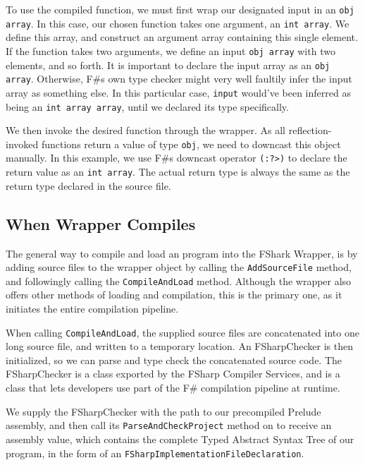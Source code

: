 To use the compiled \fshark{} function, we must first wrap our designated input in
an \texttt{obj array}. In this case, our chosen \fshark{} function takes one
argument, an \texttt{int array}. We define this array, and construct an argument
array containing this single element. If the \fshark{} function takes two
arguments, we define an input \texttt{obj array} with two elements, and so
forth.
It is important to declare the input array as an \texttt{obj array}. Otherwise,
F\#s own type checker might very well faultily infer the input array as
something else. In this particular case, \texttt{input} would've been inferred
as being an \texttt{int array array}, until we declared its type specifically.

We then invoke the desired function through the wrapper. As all
reflection-invoked functions return a value of type \texttt{obj}, we need to
downcast this object manually.
In this example, we use F\#s downcast operator \texttt{(:?>)} to declare the
return value as an \texttt{int array}. The actual return type is always the same as the
return type declared in the source \fshark{} file.

\subsection{When \fshark{} Wrapper Compiles}
\label{sec:fsharkwrappercompiles}
The general way to compile and load an \fshark{} program into the FShark Wrapper,
is by adding \fshark{} source files to the wrapper object by calling the
\texttt{AddSourceFile} method, and followingly calling the \texttt{CompileAndLoad}
method. Although the \fshark{} wrapper also offers other methods of loading and
compilation, this is the primary one, as it initiates the entire \fshark{}
compilation pipeline.

When calling \texttt{CompileAndLoad}, the supplied \fshark{} source files are
concatenated into one long source file, and written to a temporary location.
An FSharpChecker is then initialized, so we can parse and type check the
concatenated source code. The FSharpChecker is a class exported by the FSharp
Compiler Services, and is a class that lets developers use part of the F\#
compilation pipeline at runtime.

We supply the FSharpChecker with the path to our precompiled \fshark{}Prelude
assembly, and then call its \texttt{ParseAndCheckProject} method on to receive
an assembly value, which contains the complete Typed Abstract Syntax Tree of our
\fshark{} program, in the form of an \texttt{FSharpImplementationFileDeclaration}.

